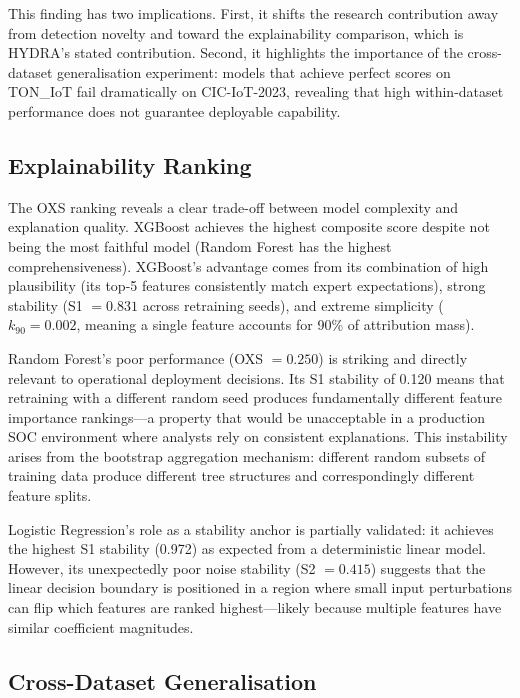 \documentclass[12pt,a4paper]{report}
\begin{document}
This finding has two implications. First, it shifts the research contribution away from detection novelty and toward the explainability comparison, which is HYDRA's stated contribution. Second, it highlights the importance of the cross-dataset generalisation experiment: models that achieve perfect scores on TON\_IoT fail dramatically on CIC-IoT-2023, revealing that high within-dataset performance does not guarantee deployable capability.

\subsection*{Explainability Ranking}

The OXS ranking reveals a clear trade-off between model complexity and explanation quality. XGBoost achieves the highest composite score despite not being the most faithful model (Random Forest has the highest comprehensiveness). XGBoost's advantage comes from its combination of high plausibility (its top-5 features consistently match expert expectations), strong stability (S1 $= 0.831$ across retraining seeds), and extreme simplicity ($k_{90} = 0.002$, meaning a single feature accounts for 90\% of attribution mass).

Random Forest's poor performance (OXS $= 0.250$) is striking and directly relevant to operational deployment decisions. Its S1 stability of 0.120 means that retraining with a different random seed produces fundamentally different feature importance rankings---a property that would be unacceptable in a production SOC environment where analysts rely on consistent explanations. This instability arises from the bootstrap aggregation mechanism: different random subsets of training data produce different tree structures and correspondingly different feature splits.

Logistic Regression's role as a stability anchor is partially validated: it achieves the highest S1 stability (0.972) as expected from a deterministic linear model. However, its unexpectedly poor noise stability (S2 $= 0.415$) suggests that the linear decision boundary is positioned in a region where small input perturbations can flip which features are ranked highest---likely because multiple features have similar coefficient magnitudes.

\subsection*{Cross-Dataset Generalisation}
\end{document}
